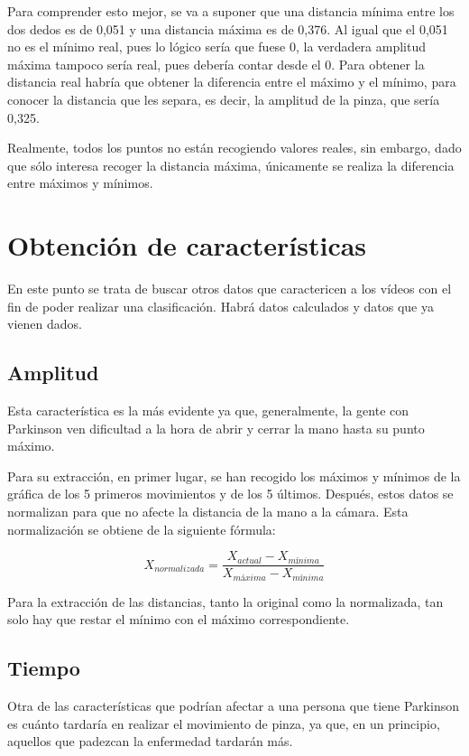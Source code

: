 Para comprender esto mejor, se va a suponer que una distancia mínima entre los dos dedos es de 0,051 y una distancia máxima es de 0,376. Al igual que el 0,051 no es el mínimo real, pues lo lógico sería que fuese 0, la verdadera amplitud máxima tampoco sería real, pues debería contar desde el 0. Para obtener la distancia real habría que obtener la diferencia entre el máximo y el mínimo, para conocer la distancia que les separa, es decir, la amplitud de la pinza, que sería 0,325. 

Realmente, todos los puntos no están recogiendo valores reales, sin embargo, dado que sólo interesa recoger la distancia máxima, únicamente se realiza la diferencia entre máximos y mínimos.

\section{Obtención de características}
En este punto se trata de buscar otros datos que caractericen a los vídeos con el fin de poder realizar una clasificación. Habrá datos calculados y datos que ya vienen dados.

\subsection{Amplitud}
Esta característica es la más evidente ya que, generalmente, la gente con Parkinson ven dificultad a la hora de abrir y cerrar la mano hasta su punto máximo.

Para su extracción, en primer lugar, se han recogido los máximos y mínimos de la gráfica de los 5 primeros movimientos y de los 5 últimos. Después, estos datos se normalizan para que no afecte la distancia de la mano a la cámara. Esta normalización se obtiene de la siguiente fórmula:

\begin{equation}
	X_{normalizada} = \frac{X_{actual} - X_{mínima}}{X_{máxima}-X_{mínima}}
\end{equation}

Para la extracción de las distancias, tanto la original como la normalizada, tan solo hay que restar el mínimo con el máximo correspondiente. 

\subsection{Tiempo}
Otra de las características que podrían afectar a una persona que tiene Parkinson es cuánto tardaría en realizar el movimiento de pinza, ya que, en un principio, aquellos que padezcan la enfermedad tardarán más.

